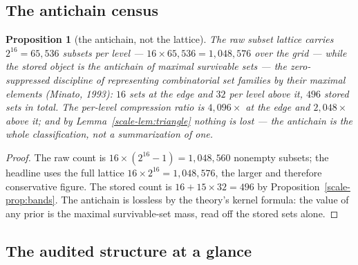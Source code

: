 \documentclass[10pt,twocolumn]{article}
\theoremstyle{plain}
\newtheorem{proposition}[theorem]{Proposition}
\theoremstyle{definition}
\theoremstyle{remark}
\begin{document}
\subsection{The antichain census}\label{scale-census}

\begin{proposition}[the antichain, not the lattice]\label{scale-prop:census}
The raw subset lattice carries \(2^{16} = 65{,}536\) subsets per
level --- \(16 \times 65{,}536 = 1{,}048{,}576\) over the grid ---
while the stored object is the antichain of maximal survivable sets --- the zero-suppressed
discipline of representing combinatorial set families by their maximal
elements (Minato, 1993):
\(16\) sets at the edge and \(32\) per level above it, \(496\) stored
sets in total. The per-level compression ratio is \(4{,}096\times\) at
the edge and \(2{,}048\times\) above it; and by
Lemma~\ref{scale-lem:triangle} nothing is lost --- the antichain is the
whole classification, not a summarization of one.
\end{proposition}

\begin{proof}
The raw count is \(16 \times (2^{16} - 1) = 1{,}048{,}560\) nonempty
subsets; the headline uses the full lattice
\(16 \times 2^{16} = 1{,}048{,}576\), the larger and therefore
conservative figure. The stored count is
\(16 + 15 \times 32 = 496\) by Proposition~\ref{scale-prop:bands}. The
antichain is lossless by the theory's kernel formula: the
value of any prior is the maximal survivable-set mass, read off the
stored sets alone.
\end{proof}

\subsection{The audited structure at a glance}\label{scale-glance}
\end{document}
